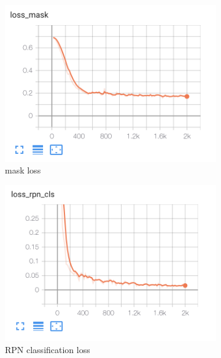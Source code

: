 \documentclass[conference]{IEEEtran}
\begin{document}
\begin{figure}[h!]
\begin{subfigure}[h!]{0.24\textwidth}
    \includegraphics[width=\textwidth]{img/loss_mask.png}
    \caption{mask loss}
    \label{fig:loss_mask}
\end{subfigure}
\hfill
\begin{subfigure}[h!]{0.24\textwidth}
    \centering
    \includegraphics[width=\textwidth]{img/loss_rpn_cls.png}
    \caption{RPN classification loss}
    \label{fig:loss_rpn_cls}
\end{subfigure}
\hfill
\begin{subfigure}[h!]{0.24\textwidth}
    \centering

\end{subfigure}
\end{figure}
\end{document}
